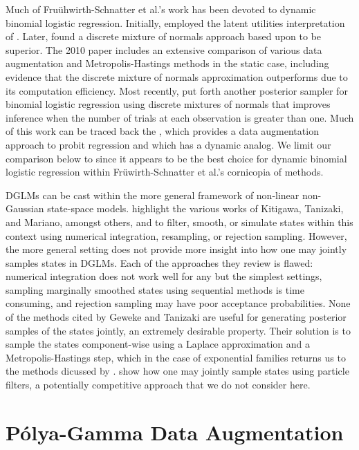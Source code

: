 \documentclass[11pt]{article}
\newcommand{\Polya}{P\'{o}lya}
\begin{document}
Much of Fru\"{u}hwirth-Schnatter et al.'s work has been devoted to dynamic
binomial logistic regression. Initially,
\cite{fruhwirth-schnatter-fruhwirth-2007} employed the latent utilities
interpretation of \cite{mcfadden-1974}.  Later,
\citep{fruhwirth-schnatter-fruhwirth-2010} found a discrete mixture of normals
approach based upon \cite{holmes-held-2006} to be superior. The 2010 paper
includes an extensive comparison of various data augmentation and
Metropolis-Hastings methods in the static case, including evidence that the
discrete mixture of normals approximation outperforms \cite{holmes-held-2006}
due to its computation efficiency.  Most recently, \cite{fussl-etal-2013} put
forth another posterior sampler for binomial logistic regression using discrete
mixtures of normals that improves inference when the number of trials at each
observation is greater than one.  Much of this work can be traced back the
\cite{albert-chib-1993}, which provides a data augmentation approach to probit
regression and which has a dynamic analog.  We limit our comparison below to
\cite{fussl-etal-2013} since it appears to be the best choice for dynamic
binomial logistic regression within Fr\"{u}wirth-Schnatter et al.'s cornicopia
of methods.

DGLMs can be cast within the more general framework of non-linear non-Gaussian
state-space models.  \cite{geweke-tanizaki-2001} highlight the various works of
Kitigawa, Tanizaki, and Mariano, amongst others, and to filter, smooth, or
simulate states within this context using numerical integration, resampling, or
rejection sampling.  However, the more general setting does not provide more
insight into how one may jointly samples states in DGLMs.  Each of the
approaches they review is flawed: numerical integration does not work well for
any but the simplest settings, sampling marginally smoothed states using
sequential methods is time consuming, and rejection sampling may have poor
acceptance probabilities.  None of the methods cited by Geweke and Tanizaki are
useful for generating posterior samples of the states jointly, an extremely
desirable property.  Their solution is to sample the states component-wise using
a Laplace approximation and a Metropolis-Hastings step, which in the case of
exponential families returns us to the methods dicussed by
\citep{gamerman-1998}.  \cite{godsill-etal-2004} show how one may jointly sample
states using particle filters, a potentially competitive approach that we do not
consider here.

\section{\Polya-Gamma Data Augmentation}
\end{document}
